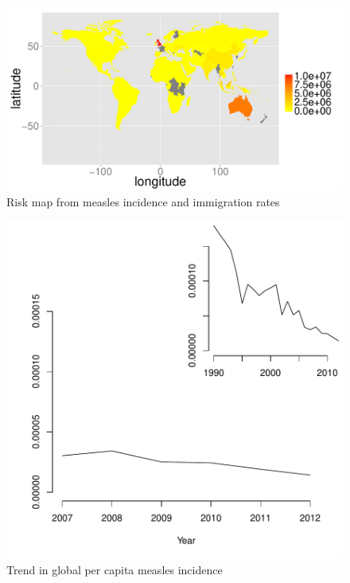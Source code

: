 \documentclass{article}
\begin{document}
\begin{figure}[h!]
\begin{center}
\includegraphics{interimreport1-010}
\end{center}
\caption{Risk map from measles incidence and immigration rates}
\label{fig:risk12}
\end{figure}

\begin{figure}[h!]
\begin{center}
\includegraphics{interimreport1-011}
\end{center}
\caption{Trend in global per capita measles incidence}
\label{fig:trendincidence}
\end{figure}
\end{document}

